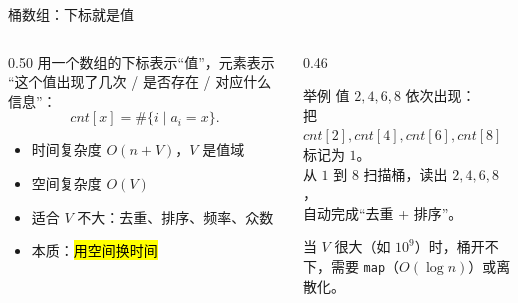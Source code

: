 \documentclass[aspectratio=169]{beamer}
\begin{document}
\begin{frame}{桶数组：下标就是值}
    \begin{columns}[T]
        \begin{column}{0.50\textwidth}
            \small
            用一个数组的下标表示“值”，元素表示
            “这个值出现了几次 / 是否存在 / 对应什么信息”：
            \[
                cnt[x]=\#\{i\mid a_i=x\}.
            \]
            \begin{itemize}
                \item 时间复杂度 $O(n+V)$，$V$ 是值域
                \item 空间复杂度 $O(V)$
                \item 适合 $V$ 不大：去重、排序、频率、众数
                \item 本质：\hl{用空间换时间}
            \end{itemize}
        \end{column}
        \begin{column}{0.46\textwidth}
            \begin{exampleblock}{举例}
                \footnotesize
                值 $2,4,6,8$ 依次出现：\\
                把 $cnt[2],cnt[4],cnt[6],cnt[8]$ 标记为 $1$。\\
                从 $1$ 到 $8$ 扫描桶，读出 $2,4,6,8$，\\
                自动完成“去重 + 排序”。
            \end{exampleblock}
            \vspace{0.4em}
            \footnotesize
            当 $V$ 很大（如 $10^9$）时，桶开不下，需要
            \texttt{map}（$O(\log n)$）或离散化。
        \end{column}
    \end{columns}
\end{frame}
\end{document}

